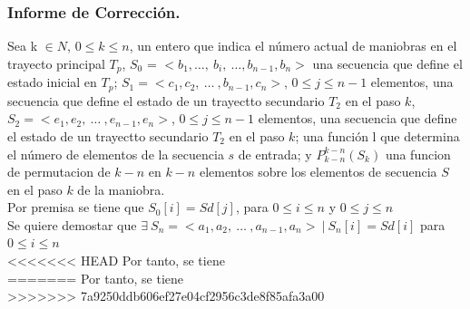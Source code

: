 \documentclass[12pt, a4paper]{article}
\begin{document}
\subsubsection{Informe de Corrección.}
Sea k $\in N$, $ 0 \leq k \leq n$, un entero que indica el número actual de maniobras en el trayecto principal $T_p$,
$S_0$ = $<b_1, \ldots,~b_i,~\ldots, b_{n-1}, b_n>$ una secuencia que define el estado inicial en $T_p$;
$S_1 = < c_1, c_2,~\ldots~, b_{n-1}, c_n >$, $ 0 \leq j \leq n - 1$ elementos, una secuencia que define el estado de un trayectto secundario $T_2$ en el paso $k$,
$S_2 =  < e_1, e_2,~\ldots~, e_{n-1}, e_n >$, $ 0 \leq j \leq n - 1$ elementos, una secuencia que define el estado de un trayectto secundario $T_2$ en el paso $k$;
una función l que determina el número de elementos de la secuencia $s$ de entrada;
y $P_{k-n}^{k-n}(S_k)$ una funcion de permutacion de $k-n$ en $k-n$ elementos sobre los elementos de secuencia
$S$ en el paso $k$ de la maniobra. \\
Por premisa se tiene que $S_0[i] = Sd[j]$,  para $0 \leq i \leq n$ y $0 \leq j \leq n$ \\
Se quiere demostar que $\exists~ S_n = < a_1, a_2, ~\ldots~, a_{n-1}, a_n >~|~S_n[i] = Sd[i]$ para $0 \leq i \leq n$\\

<<<<<<< HEAD
Por tanto, se tiene \\
=======
 Por tanto, se tiene \\
>>>>>>> 7a9250ddb606ef27e04cf2956c3de8f85afa3a00
\end{document}
